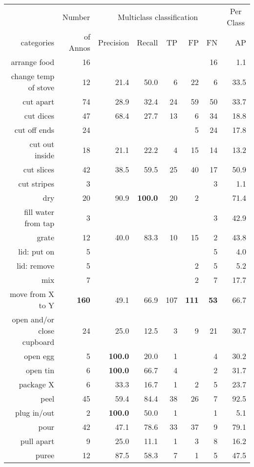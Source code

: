 \begin{tabular}{r r r@{\ \ }r@{\ \ }r@{\ \ }r@{\ \ }r r}
\toprule  & \multicolumn{1}{c}{Number}  & \multicolumn{5}{c}{Multiclass classification}  & \multicolumn{1}{c}{Per Class} \\
categories&of Annos&Precision&Recall&TP&FP&FN&AP\\
\cmidrule(lr){1-1} \cmidrule(lr){2-2} \cmidrule(lr){3-7} \cmidrule(lr){8-8}
arrange food & 16 &  &  &  &  & 16 & 1.1 \\
change temp of stove & 12 & 21.4 & 50.0 & 6 & 22 & 6 & 33.5 \\
cut apart & 74 & 28.9 & 32.4 & 24 & 59 & 50 & 33.7 \\
cut dices & 47 & 68.4 & 27.7 & 13 & 6 & 34 & 18.8 \\
cut off ends & 24 &  &  &  & 5 & 24 & 17.8 \\
cut out inside & 18 & 21.1 & 22.2 & 4 & 15 & 14 & 13.2 \\
cut slices & 42 & 38.5 & 59.5 & 25 & 40 & 17 & 50.9 \\
cut stripes & 3 &  &  &  &  & 3 & 1.1 \\
dry & 20 & 90.9 & \textbf{100.0} & 20 & 2 &  & 71.4 \\
fill water from tap & 3 &  &  &  &  & 3 & 42.9 \\
grate & 12 & 40.0 & 83.3 & 10 & 15 & 2 & 43.8 \\
lid: put on & 5 &  &  &  &  & 5 & 4.0 \\
lid: remove & 5 &  &  &  & 2 & 5 & 5.2 \\
mix & 7 &  &  &  & 2 & 7 & 17.7 \\
move from X to Y & \textbf{160} & 49.1 & 66.9 & 107 & \textbf{111} & \textbf{53} & 66.7 \\
open and/or close cupboard & 24 & 25.0 & 12.5 & 3 & 9 & 21 & 30.7 \\
open egg & 5 & \textbf{100.0} & 20.0 & 1 &  & 4 & 30.2 \\
open tin & 6 & \textbf{100.0} & 66.7 & 4 &  & 2 & 31.7 \\
package X & 6 & 33.3 & 16.7 & 1 & 2 & 5 & 23.7 \\
peel & 45 & 59.4 & 84.4 & 38 & 26 & 7 & 92.5 \\
plug in/out & 2 & \textbf{100.0} & 50.0 & 1 &  & 1 & 5.1 \\
pour & 42 & 47.1 & 78.6 & 33 & 37 & 9 & 79.1 \\
pull apart & 9 & 25.0 & 11.1 & 1 & 3 & 8 & 16.2 \\
puree & 12 & 87.5 & 58.3 & 7 & 1 & 5 & 47.5 \\

\end{tabular}
